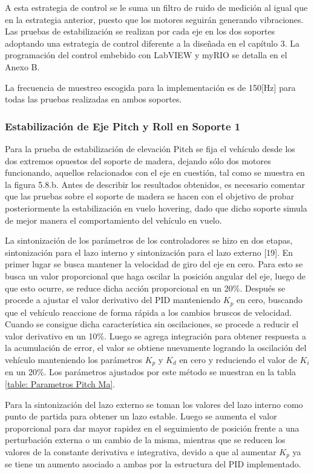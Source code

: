 \documentclass[\main/main.tex]{subfiles}
\begin{document}
A esta estrategia de control se le suma un filtro de ruido de medición
al igual que en la estrategia anterior, puesto que los motores seguirán
generando vibraciones. Las pruebas de estabilización se realizan por
cada eje en los dos soportes adoptando una estrategia de control
diferente a la diseñada en el capítulo 3. La programación
del control embebido con LabVIEW y myRIO se detalla en el Anexo B.

La frecuencia de muestreo escogida para la implementación es de 150[Hz] para todas las pruebas realizadas en ambos soportes.

\subsubsection{Estabilización de Eje Pitch y Roll en Soporte 1}

Para la prueba de estabilización de elevación Pitch se fija el vehículo desde los
dos extremos opuestos del soporte de madera, dejando sólo dos motores
funcionando, aquellos relacionados con el eje en cuestión, tal como se muestra en la figura 5.8.b. Antes de
describir los resultados obtenidos, es necesario comentar que las
pruebas sobre el soporte de madera se hacen con el objetivo de
probar posteriormente la estabilización en vuelo hovering, dado que
dicho soporte simula de mejor manera el comportamiento del vehículo
en vuelo. 

La sintonización de los parámetros de los controladores se hizo en
dos etapas, sintonización para el lazo interno y sintonización para
el lazo externo [19]. En primer lugar se busca mantener la velocidad de
giro del eje en cero. Para esto se busca un valor proporcional que
haga oscilar la posición angular del eje, luego de que esto ocurre,
se reduce dicha acción proporcional en un 20\%. Después se procede
a ajustar el valor derivativo del PID manteniendo $K_{p}$ en cero,
buscando que el vehículo reaccione de forma rápida a los cambios bruscos
de velocidad. Cuando se consigue dicha característica sin oscilaciones,
se procede a reducir el valor derivativo en un 10\%. Luego se agrega
integración para obtener respuesta a la acumulación de error, el valor
se obtiene nuevamente logrando la oscilación del vehículo manteniendo
los parámetros $K_{p}$ y $K_{d}$ en cero y reduciendo el valor de
$K_{i}$ en un 20\%. Los parámetros ajustados por este método se muestran en la tabla \ref{table: Parametros Pitch Ma}.

Para la sintonización del lazo externo se toman los valores del lazo
interno como punto de partida para obtener un lazo estable. Luego
se aumenta el valor proporcional para dar mayor rapidez en el seguimiento
de posición frente a una perturbación externa o un cambio de la misma,
mientras que se reducen los valores de la constante derivativa e integrativa,
devido a que al aumentar $K_{p}$ ya se tiene un aumento asociado
a ambas por la estructura del PID implementado.
\end{document}
